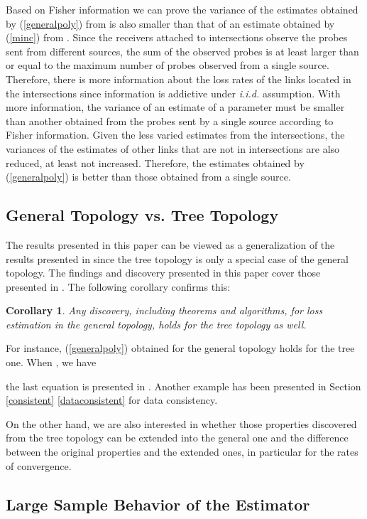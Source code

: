\documentclass[10pt,twocolumn]{IEEEtran}
\newtheorem{corollary}{\hspace*{1pc}Corollary}
\begin{document}
Based on Fisher information we can prove the variance of the estimates
obtained by (\ref{generalpoly}) from  is also smaller than
that of an estimate obtained by (\ref{minc}) from .
Since the receivers attached to intersections observe the probes sent
from different sources, the sum of the observed probes is at least
larger than or equal to the maximum number of probes observed from a
single source. Therefore, there is more information about the loss
rates of the links located in the intersections since information is
addictive under {\it i.i.d.} assumption. With more information, the
variance of an estimate of a parameter must be smaller than another
obtained from the probes sent by a single source according to Fisher
information. Given the less varied estimates from the intersections,
the variances of the estimates of other links that are not in
intersections are also reduced, at least not increased. Therefore, the
estimates obtained by (\ref{generalpoly}) is better than those
obtained from a single source.


\subsection{General Topology vs. Tree Topology}

The results presented in this paper can be viewed as a generalization
of the results presented in \cite{CDHT99} since the tree topology is
only a special case of the general topology. The findings and
discovery presented in this paper cover those presented in
\cite{CDHT99}. The following corollary confirms this:
\begin{corollary}\label{special case}
Any discovery, including theorems and algorithms, for loss estimation
in the general topology, holds for the tree topology as well.
\end{corollary}

For instance, (\ref{generalpoly}) obtained for the general topology
holds for the tree one. When ,  we have


\noindent the last equation is   presented in
\cite{CDHT99}. Another example has been presented in Section
\ref{consistent} \ref{dataconsistent} for data consistency.

 On the other hand, we are also interested in whether
those properties discovered from the tree topology can be extended
into the general one and the difference between the original
properties and the extended ones, in particular for the rates of
convergence.

\subsection{Large Sample Behavior of the Estimator}
\end{document}
